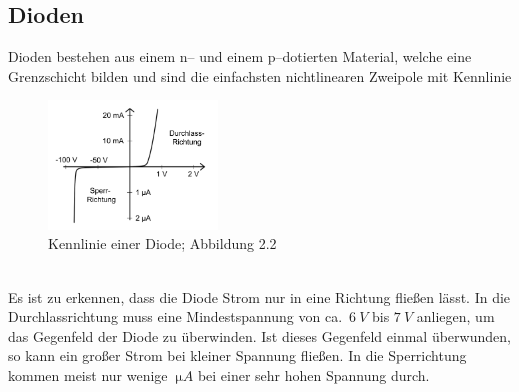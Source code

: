 \documentclass[a4paper,10pt]{article}
\numberwithin{equation}{section}
\begin{document}
\subsection{Dioden}
Dioden bestehen aus einem n-- und einem p--dotierten Material, welche eine Grenzschicht bilden und sind die einfachsten nichtlinearen Zweipole mit Kennlinie
\begin{figure}[h]
        \centering
        \includegraphics[width=0.4\textwidth]{diode_kennlinie.png}
        \caption{Kennlinie einer Diode; Abbildung 2.2 \cite{Praktikumsanleitung}}
\end{figure}\\
Es ist zu erkennen, dass die Diode Strom nur in eine Richtung fließen lässt.
In die Durchlassrichtung muss eine Mindestspannung von ca.\ $\SI{6}{V}$ bis $\SI{7}{V}$ anliegen, um das Gegenfeld der Diode zu überwinden.
Ist dieses Gegenfeld einmal überwunden, so kann ein großer Strom bei kleiner Spannung fließen.
In die Sperrichtung kommen meist nur wenige $\SI{}{\micro A}$ bei einer sehr hohen Spannung durch.
\end{document}

